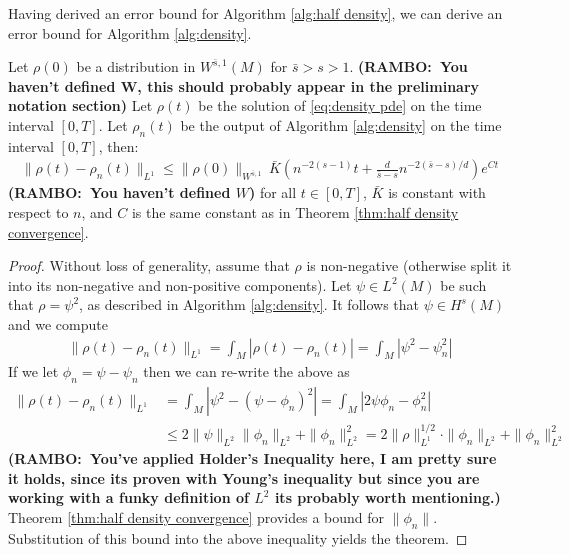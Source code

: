 \documentclass[final,leqno]{siamltex1213}
\newcommand{\ram}[1]{{\normalsize{\textbf{({\color{red}RAMBO:\ }#1)}}}}
\begin{document}
Having derived an error bound for Algorithm \ref{alg:half density}, we can derive an error bound for Algorithm \ref{alg:density}.

\begin{theorem} \label{thm:density convergence}
	Let $\rho(0)$ be a distribution in $W^{\bar{s},1}(M)$ for $\bar{s} > s >1$. \ram{You haven't defined W, this should probably appear in the preliminary notation section}
	Let $\rho(t)$ be the solution of \eqref{eq:density pde} on the time interval $[0,T]$.
	Let $\rho_{n}(t)$ be the output of Algorithm \ref{alg:density} on the time interval $[0,T]$, then:
	\begin{align}
		\| \rho(t) - \rho_{n}(t) \|_{L^{1}} \leq \| \rho(0) \|_{W^{\bar{s},1}} \, \bar{K} \left( n^{-2(s-1)} t+  \frac{d}{\bar{s}-s} n^{-2(\bar{s}-s)/d} \right) e^{C t}
	\end{align}
	 \ram{You haven't defined $W$} for all $t \in [0,T]$, $\bar{K}$ is constant with respect to $n$, and $C$ is the same constant as in Theorem \ref{thm:half density convergence}.
\end{theorem}

\begin{proof}
	Without loss of generality, assume that $\rho$ is non-negative (otherwise split it into its non-negative and non-positive components).
	Let $\psi \in L^{2}(M)$ be such that $\rho =  \psi ^{2}$, as described in Algorithm \ref{alg:density}.
	It follows that $\psi \in H^{s}(M)$ and we compute
	\begin{align}
		\| \rho(t) - \rho_{n}(t) \|_{L^{1}} = \int_{M} | \rho(t) - \rho_{n}(t)| = \int_{M} | \psi^{2} - \psi_{n}^{2} |
	\end{align}
	If we let $\phi_{n} = \psi - \psi_{n}$ then we can re-write the above as
	\begin{align}
		\| \rho(t) - \rho_{n}(t) \|_{L^{1}}  &= \int_{M} | \psi^{2} - (\psi - \phi_{n})^{2} | = \int_{M} | 2 \psi \phi_{n} - \phi_{n}^{2} | \\
			&\leq 2 \| \psi \|_{L^{2}} \| \phi_{n}\|_{L^{2}} + \| \phi_{n} \|_{L^{2}}^{2} = 2 \| \rho \|_{L^{1}}^{1/2} \cdot \| \phi_{n} \|_{L^{2}} + \| \phi_{n} \|_{L^{2}}^{2}
	\end{align}
	\ram{You've applied Holder's Inequality here, I am pretty sure it holds, since its proven with Young's inequality but since you are working with a funky definition of $L^2$ its probably worth mentioning.}
	Theorem \ref{thm:half density convergence} provides a bound for $\| \phi_{n} \|$.
	Substitution of this bound into the above inequality yields the theorem.
\end{proof}
\end{document}
